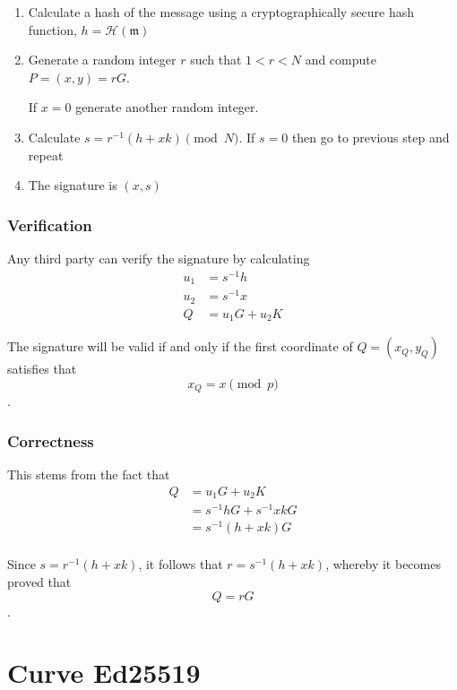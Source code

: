 \begin{enumerate}
	
	\item Calculate a hash of the message using a cryptographically secure hash function, \(h = \mathcal{H}(\mathfrak{m})\)
	
	\item Generate a random integer \(r\) such that \(1 < r < N\) and compute \(P = (x, y) = r G\). 

       If \(x = 0\) generate another random integer.
	
	\item Calculate \(s = r^{-1} (h + x k) \pmod N\). If \(s = 0\) then go to previous step and repeat
	
	\item The signature is \((x, s)\)
\end{enumerate}


\subsubsection*{Verification}

Any third party can verify the signature by calculating
\begin{align*}
  u_1 & = s^{-1} h \\
  u_2 & = s^{-1} x \\
  Q   & = u_1 G + u_2 K
\end{align*}

The signature will be valid if and only if the first coordinate of \(Q = (x_Q, y_Q)\) satisfies that  
\[x_Q = x \pmod p\]. 

\subsubsection*{Correctness}

This stems from the fact that
\begin{align*}
Q &= u_1 G + u_2 K \\
  &= s^{-1} h G + s^{ -1} x k G \\
  &= s^{-1} (h + x k) G \\
\end{align*}

Since \(s = r^{-1} (h + x k) \), it follows that \(r = s^{-1}(h + x k)\), whereby it becomes proved that \[Q = r G\].

\section{Curve Ed25519}

